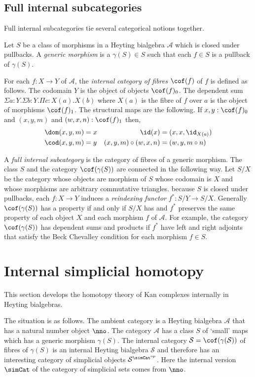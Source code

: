 \documentclass{tac}
\newcommand\cat\mathcal
\newcommand\ri{^*}
\newcommand\dual{^{\mathrm{op}}}
\newcommand\s{^{\simCat\dual}}
\newcommand\of{:}
\newcommand\gen\gamma
\begin{document}
\subsection{Full internal subcategories}\label{full internal subcategory}
Full internal subcategories tie several categorical notions together. 

Let $S$ be a class of morphisms in a Heyting bialgebra $\cat A$ which is closed under pullbacks. A \emph{generic morphism} is a $\gen(S)\in S$ such that each $f\in S$ is a pullback of $\gen(S)$.


For each $f\of X\to Y$ of $\cat A$, the \emph{internal category of fibres} $\cof(f)$ of $f$ is defined as follows. The codomain $Y$ is the object of objects $\cof(f)_0$. The dependent sum $\Sigma a\of Y.\Sigma b\of Y.\Pi c\of X(a).X(b)$ where $X(a)$ is the fibre of $f$ over $a$ is the object of morphisms $\cof(f)_1$. The structural maps are the following. If $x,y\of \cof(f)_0$ and $(x,y,m)$ and $(w,x,n)\of\cof(f)_1$ then,
\begin{align*}
\dom(x,y,m) &= x & 
\id(x) &= (x,x,\id_{X(a)})\\
\cod(x,y,m) &= y &
(x,y,m)\circ (w,x,n) &= (w,y,m\circ n)
\end{align*}\label{category of fibres}

A \emph{full internal subcategory} is the category of fibres of a generic morphism. The class $S$ and the category $\cof(\gen(S))$ are connected in the following way. Let $S/X$ be the category whose objects are morphism of $S$ whose codomain is $X$ and whose morphisms are arbitrary commutative triangles. because $S$ is closed under pullbacks, each $f\of X\to Y$ induces a \emph{reindexing functor} $f\ri\of S/Y\to S/X$. Generally $\cof(\gen(S))$ has a property if and only if $S/X$ has and $f\ri$ preserves the same property of each object $X$ and each morphism $f$ of $\cat A$. For example, the category $\cof(\gen(S))$ has dependent sums and products if $f\ri$ have left and right adjoints that satisfy the Beck Chevalley condition for each morphism $f\in S$.

\section{Internal simplicial homotopy}
This section develops the homotopy theory of Kan complexes internally in Heyting bialgebras.

The situation is as follows. The ambient category is a Heyting bialgebra $\cat A$ that has a natural number object $\nno$. The category $\cat A$ has a class $S$ of `small' maps which has a generic morphism $\gen(S)$. The internal category $\cat S = \cof(\gen(\cat S))$ of fibres of $\gen(S)$ is an internal Heyting bialgebra $\cat S$ and therefore has an interesting category of simplicial objects $\cat S\s$. Here the internal version $\simCat$ of the category of simplicial sets comes from $\nno$.
\end{document}
